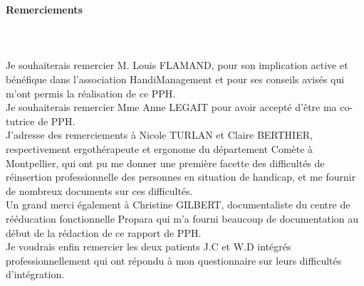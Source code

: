 \vspace*{50mm}
\textbf{\Huge{Remerciements}}\\\\\\\\

Je souhaiterais remercier M. Louis FLAMAND, pour son implication active et bénéfique dans l'association HandiManagement et pour ses conseils avisés qui m'ont permis la réalisation de ce PPH.\\

Je souhaiterais remercier Mme Anne LEGAIT pour avoir accepté d'être ma co-tutrice de PPH.\\

J'adresse des remerciements à Nicole TURLAN et Claire BERTHIER, respectivement ergothérapeute et ergonome du département Comète à Montpellier, qui ont pu me donner une première facette des difficultés de réinsertion professionnelle des personnes en situation de handicap, et me fournir de nombreux documents sur ces difficultés.\\

Un grand merci également à Christine GILBERT, documentaliste du centre de rééducation fonctionnelle Propara qui m'a fourni beaucoup de documentation au début de la rédaction de ce rapport de PPH.\\

Je voudrais enfin remercier les deux patients J.C et W.D intégrés professionnellement qui ont répondu à mon questionnaire sur leurs difficultés d'intégration.